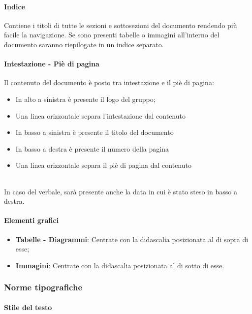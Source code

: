 \paragraph{Indice} 

Contiene i titoli di tutte le sezioni e sottosezioni del documento rendendo più facile la navigazione.
Se sono presenti tabelle o immagini all'interno del documento saranno riepilogate in un indice separato.

\paragraph{Intestazione - Piè di pagina} 

Il contenuto del documento è posto tra intestazione e il piè di pagina:

\begin{itemize}
\item In alto a sinistra è presente il logo del gruppo;
\item Una linea orizzontale separa l’intestazione dal contenuto
\item In basso a sinistra è presente il titolo del documento
\item In basso a destra è presente il numero della pagina
\item Una linea orizzontale separa il piè di pagina dal contenuto
\end{itemize}
~\\
In caso del verbale, sarà presente anche la data in cui è stato steso in basso a destra.

\paragraph{Elementi grafici}

\begin{itemize}
\item \textbf{Tabelle - Diagrammi}: Centrate con la didascalia posizionata al di sopra di esse;
\item \textbf{Immagini}: Centrate con la didascalia posizionata al di sotto di esse.
\end{itemize}


\subsubsection{Norme tipografiche}

\paragraph{Stile del testo}

